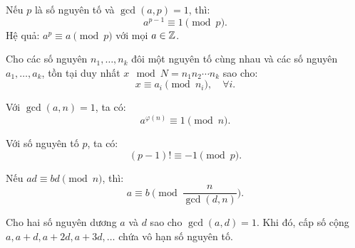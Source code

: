 \documentclass[../imo-training-open-book.tex]{subfiles}
\begin{document}
\begin{theorem}
    \label{theorem:fermat-little}
    Nếu \( p \) là số nguyên tố và \( \gcd(a, p) = 1 \), thì:
    \[
        a^{p-1} \equiv 1 \pmod{p}.
    \]
    Hệ quả: \( a^p \equiv a \pmod{p} \) với mọi \( a \in \mathbb Z \).
\end{theorem}

\vspace{1em}

\begin{theorem}
    \label{theorem:chinese-remainder-theorem}
    Cho các số nguyên \( n_1, \dots, n_k \) đôi một nguyên tố cùng nhau và các số nguyên \( a_1, \dots, a_k \), tồn tại duy nhất \( x \mod N = n_1n_2\cdots n_k \) sao cho:
    \[
        x \equiv a_i \pmod{n_i},\quad \forall i.
    \]
\end{theorem}

\vspace{1em}

\begin{theorem}
    \label{theorem:euler}
    Với \( \gcd(a, n) = 1 \), ta có:
    \[
        a^{\varphi(n)} \equiv 1 \pmod{n}.
    \]
\end{theorem}

\vspace{1em}

\begin{theorem}
    \label{theorem:wilson}
    Với số nguyên tố \( p \), ta có:
    \[
        (p - 1)! \equiv -1 \pmod{p}.
    \]
\end{theorem}

\vspace{1em}

\begin{theorem}
    \label{theorem:cancel-modulo}
    Nếu \( ad \equiv bd \pmod{n} \), thì:
    \[
        a \equiv b \pmod{\frac{n}{\gcd(d,n)}}.
    \]
\end{theorem}

\begin{theorem}
    \label{theorem:dirichlet-ap}
    Cho hai số nguyên dương \( a \) và \( d \) sao cho \(\gcd(a,d) = 1\). Khi đó, cấp số cộng \( a, a+d, a+2d, a+3d, \ldots \) chứa vô hạn số nguyên tố.
\end{theorem}
\end{document}
